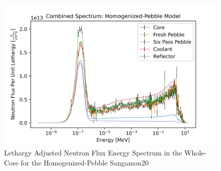 \begin{figure}[H]
\centering
  \includegraphics[width=0.95\linewidth]{figures/all_spec_homog_v2}
  \caption{Lethargy Adjusted Neutron Flux Energy Spectrum in the Whole-Core for the Homogenized-Pebble Sangamon20}
  \label{fig:hom-all}
\end{figure}


